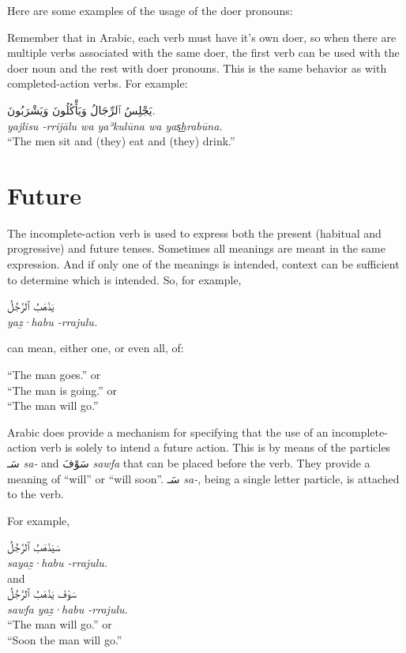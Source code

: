 \documentclass[
  10pt,
]{book}
\begin{document}
Here are some examples of the usage of the doer pronouns:

Remember that in Arabic, each verb must have it's own doer, so when there are multiple verbs associated with the same doer, the first verb can be used with the doer noun and the rest with doer pronouns. This is the same behavior as with completed-action verbs. For example:

\foreignlanguage{arabic}{يَجْلِسُ ٱلرِّجَالُ وَيَأْکُلُونَ وَيَشْرَبُونَ.}\\
\emph{yajlisu -rrijālu wa yaʾkulūna wa yas͟hrabūna.}\\
\enquote{The men sit and (they) eat and (they) drink.}

\section{Future}\label{future}

The incomplete-action verb is used to express both the present (habitual and progressive) and future tenses. Sometimes all meanings are meant in the same expression. And if only one of the meanings is intended, context can be sufficient to determine which is intended. So, for example,

\foreignlanguage{arabic}{يَذْهَبُ ٱلرَّجُلُ}\\
\emph{yaẕ·habu -rrajulu.}

can mean, either one, or even all, of:

\enquote{The man goes.} or\\
\enquote{The man is going.} or\\
\enquote{The man will go.}

Arabic does provide a mechanism for specifying that the use of an incomplete-action verb is solely to intend a future action. This is by means of the particles \foreignlanguage{arabic}{سَـ} \emph{sa-} and \foreignlanguage{arabic}{سَوْفَ} \emph{sawfa} that can be placed before the verb. They provide a meaning of \enquote{will} or \enquote{will soon}. \foreignlanguage{arabic}{سَـ} \emph{sa-}, being a single letter particle, is attached to the verb.

For example,

\foreignlanguage{arabic}{سَيَذْهَبُ ٱلرَّجُلُ}\\
\emph{sayaẕ·habu -rrajulu.}\\
and\\
\foreignlanguage{arabic}{سَوْفَ يَذْهَبُ ٱلرَّجُلُ}\\
\emph{sawfa yaẕ·habu -rrajulu.}\\
\enquote{The man will go.} or\\
\enquote{Soon the man will go.}
\end{document}
